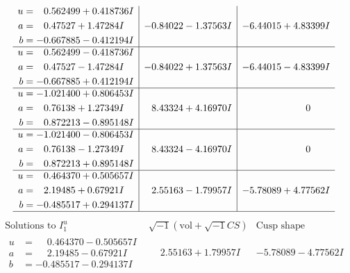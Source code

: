 \documentclass[1p]{elsarticle_modified}
\theoremstyle{definition}
\newcommand{\I}{\sqrt{-1}}
\begin{document}
$$\begin{array}{c|c|c}
\begin{aligned}
u &= \phantom{-}0.562499 + 0.418736 I \\
a &= \phantom{-}0.47527 + 1.47284 I \\
b &= -0.667885 - 0.412194 I\end{aligned}
 & -0.84022 - 1.37563 I & -6.44015 + 4.83399 I \\ \hline\begin{aligned}
u &= \phantom{-}0.562499 - 0.418736 I \\
a &= \phantom{-}0.47527 - 1.47284 I \\
b &= -0.667885 + 0.412194 I\end{aligned}
 & -0.84022 + 1.37563 I & -6.44015 - 4.83399 I \\ \hline\begin{aligned}
u &= -1.021400 + 0.806453 I \\
a &= \phantom{-}0.76138 + 1.27349 I \\
b &= \phantom{-}0.872213 - 0.895148 I\end{aligned}
 & \phantom{-}8.43324 + 4.16970 I & \phantom{-0.000000 } 0 \\ \hline\begin{aligned}
u &= -1.021400 - 0.806453 I \\
a &= \phantom{-}0.76138 - 1.27349 I \\
b &= \phantom{-}0.872213 + 0.895148 I\end{aligned}
 & \phantom{-}8.43324 - 4.16970 I & \phantom{-0.000000 } 0 \\ \hline\begin{aligned}
u &= \phantom{-}0.464370 + 0.505657 I \\
a &= \phantom{-}2.19485 + 0.67921 I \\
b &= -0.485517 + 0.294137 I\end{aligned}
 & \phantom{-}2.55163 - 1.79957 I & -5.78089 + 4.77562 I\\
 \hline 
 \end{array}$$\newpage$$\begin{array}{c|c|c}  
\text{Solutions to }I^u_{1}& \I (\text{vol} + \sqrt{-1}CS) & \text{Cusp shape}\\
 \hline 
\begin{aligned}
u &= \phantom{-}0.464370 - 0.505657 I \\
a &= \phantom{-}2.19485 - 0.67921 I \\
b &= -0.485517 - 0.294137 I\end{aligned}
 & \phantom{-}2.55163 + 1.79957 I & -5.78089 - 4.77562 I \\ \hline\begin{aligned}

\end{aligned}
\end{array}$$
\end{document}
